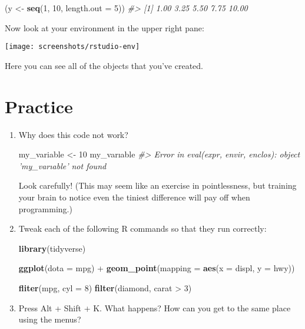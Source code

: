 \documentclass[]{book}
\newenvironment{Shaded}{\begin{snugshade}}{\end{snugshade}}
\newcommand{\KeywordTok}[1]{\textcolor[rgb]{0.13,0.29,0.53}{\textbf{{#1}}}}
\newcommand{\DataTypeTok}[1]{\textcolor[rgb]{0.13,0.29,0.53}{{#1}}}
\newcommand{\DecValTok}[1]{\textcolor[rgb]{0.00,0.00,0.81}{{#1}}}
\newcommand{\StringTok}[1]{\textcolor[rgb]{0.31,0.60,0.02}{{#1}}}
\newcommand{\CommentTok}[1]{\textcolor[rgb]{0.56,0.35,0.01}{\textit{{#1}}}}
\newcommand{\NormalTok}[1]{{#1}}
\begin{document}
\begin{Shaded}
\begin{Highlighting}[]
\NormalTok{(y <-}\StringTok{ }\KeywordTok{seq}\NormalTok{(}\DecValTok{1}\NormalTok{, }\DecValTok{10}\NormalTok{, }\DataTypeTok{length.out =} \DecValTok{5}\NormalTok{))}
\CommentTok{#> [1]  1.00  3.25  5.50  7.75 10.00}
\end{Highlighting}
\end{Shaded}

Now look at your environment in the upper right pane:

\begin{center}\texttt{[image: screenshots/rstudio-env]} \end{center}

Here you can see all of the objects that you've created.

\section{Practice}\label{practice}

\begin{enumerate}
\def\labelenumi{\arabic{enumi}.}
\item
  Why does this code not work?

\begin{Shaded}
\begin{Highlighting}[]
\NormalTok{my_variable <-}\StringTok{ }\DecValTok{10}
\NormalTok{my_varıable}
\CommentTok{#> Error in eval(expr, envir, enclos): object 'my_varıable' not found}
\end{Highlighting}
\end{Shaded}

  Look carefully! (This may seem like an exercise in pointlessness, but
  training your brain to notice even the tiniest difference will pay off
  when programming.)
\item
  Tweak each of the following R commands so that they run correctly:

\begin{Shaded}
\begin{Highlighting}[]
\KeywordTok{library}\NormalTok{(tidyverse)}

\KeywordTok{ggplot}\NormalTok{(}\DataTypeTok{dota =} \NormalTok{mpg) +}\StringTok{ }
\StringTok{  }\KeywordTok{geom_point}\NormalTok{(}\DataTypeTok{mapping =} \KeywordTok{aes}\NormalTok{(}\DataTypeTok{x =} \NormalTok{displ, }\DataTypeTok{y =} \NormalTok{hwy))}

\KeywordTok{fliter}\NormalTok{(mpg, }\DataTypeTok{cyl =} \DecValTok{8}\NormalTok{)}
\KeywordTok{filter}\NormalTok{(diamond, carat >}\StringTok{ }\DecValTok{3}\NormalTok{)}
\end{Highlighting}
\end{Shaded}
\item
  Press Alt + Shift + K. What happens? How can you get to the same place
  using the menus?
\end{enumerate}
\end{document}
